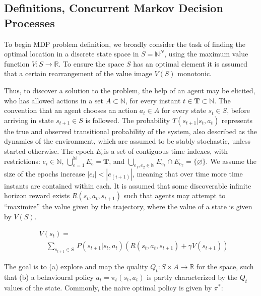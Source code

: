 \documentclass[compsoc,journal,letterpaper,10pt,draftcls,twocolumn]{IEEEtran}
\begin{document}
\subsection{Definitions, Concurrent Markov Decision
Processes}\label{definitions-concurrent-markov-decision-processes}

To begin MDP problem definition, we broadly consider the task of finding
the optimal location in a discrete state space in
\(S = \mathbb{N}^{N}\), using the maximum value function
\(V:S\rightarrow\mathbb{R}\). To ensure the space \(S\) has an
optimal element it is assumed that a certain rearrangement of the value
image $V(S)$ monotonic.

Thus, to discover a solution to the problem, the help of an agent may be
elicited, who has allowed actions in a set \(A \subset \mathbb{N}\), for
every instant \(t \in \mathbf{T}\subset\mathbb{N}\). The
convention that an agent chooses an action \(a_{t} \in A\) for every
state \(s_{t} \in S\), before arriving in state \(s_{t + 1} \in S\) is
followed. The probability \(T\left( s_{t + 1} |s_{t}, a_{t}\right)\)
represents the true and observed transitional probability of the system,
also described as the dynamics of the environment, which are assumed to
be stably stochastic, unless started otherwise. The epoch \(E_{e}\)is a
set of contiguous time indexes, with restrictions:
\(e_{i}\in\mathbb{N}\), \(\bigcup_{e = 1}^{\mathbb{N}}E_{e} = \mathbf{T}\), and
\(\bigcup_{e_{1},e_{2}\in\mathbb{ N}}{E_{e_{1}} \cap E_{e_{2}}} = \{\varnothing\}\).
We assume the size of the epochs increase
\(\left| e_{i} \right| < \left| e_{(i + 1)} \right|\), meaning that
over time more time instants are contained within each. It is assumed
that some discoverable infinite horizon reward exists
\(R\left( s_{t}, a_{t}, s_{t + 1} \right)\) such that agents may attempt
to ``maximize'' the value given by the trajectory, where the value of a
state is given by $V\left( S \right)$.

\begin{align}
& V\left( s_{t} \right) = \nonumber \\ 
& \quad
\sum_{s_{t + 1} \in S\ }{P\left( s_{t + 1}|s_{t},a_{t} \right)\left( R\left( s_{t},a_{t},s_{t + 1} \right) + \gamma V\left( s_{t + 1} \right) \right)}
\end{align}

The goal is to (a) explore and map the quality
\(Q_{t}:S \times A\mathbb{\rightarrow R}\) for the space, such that (b)
a behavioural policy \(a_{t} = \pi_{t}(s_{t}, a_{t})\) is partly
characterized by the \(Q_{t}\) values of the state. Commonly, the naive
optimal policy is given by \(\pi^{*}\):
\end{document}
